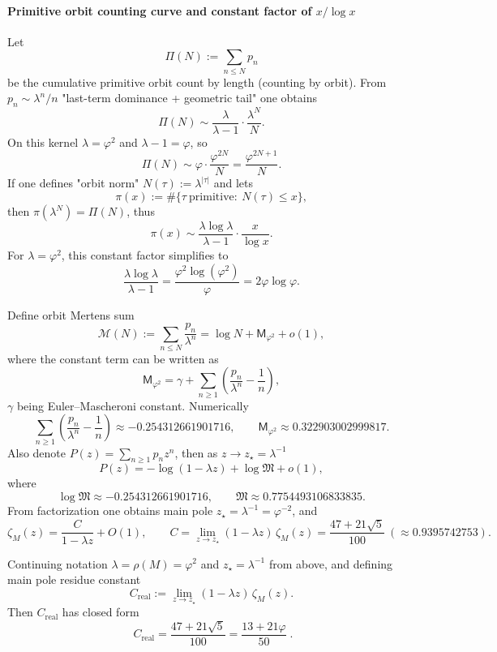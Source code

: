 \paragraph{Primitive orbit counting curve and constant factor of \texorpdfstring{$x/\log x$}{x/log x}}\label{par:finite-rh-primitive-xlogx}
Let
\[
\Pi(N):=\sum_{n\le N}p_n
\]
be the cumulative primitive orbit count by length (counting by orbit). From $p_n\sim \lambda^n/n$ "last-term dominance + geometric tail" one obtains
\[
\Pi(N)\sim \frac{\lambda}{\lambda-1}\cdot \frac{\lambda^N}{N}.
\]
On this kernel $\lambda=\varphi^2$ and $\lambda-1=\varphi$, so
\[
\Pi(N)\sim \varphi\cdot\frac{\varphi^{2N}}{N}=\frac{\varphi^{2N+1}}{N}.
\]
If one defines "orbit norm" $N(\tau):=\lambda^{|\tau|}$ and lets
\[
\pi(x):=\#\{\tau\ \mathrm{primitive}:\ N(\tau)\le x\},
\]
then $\pi(\lambda^N)=\Pi(N)$, thus
\[
\pi(x)\sim \frac{\lambda\log\lambda}{\lambda-1}\cdot \frac{x}{\log x}.
\]
For $\lambda=\varphi^2$, this constant factor simplifies to
\[
\frac{\lambda\log\lambda}{\lambda-1}
=\frac{\varphi^2\log(\varphi^2)}{\varphi}
=2\varphi\log\varphi.
\]

Define orbit Mertens sum
\[
\mathcal{M}(N):=\sum_{n\le N}\frac{p_n}{\lambda^n}
=\log N+\mathsf{M}_{\varphi^2}+o(1),
\]
where the constant term can be written as
\[
\mathsf{M}_{\varphi^2}
=\gamma+\sum_{n\ge 1}\left(\frac{p_n}{\lambda^n}-\frac{1}{n}\right),
\]
$\gamma$ being Euler--Mascheroni constant. Numerically
\[
\sum_{n\ge 1}\left(\frac{p_n}{\lambda^n}-\frac{1}{n}\right)\approx -0.254312661901716,
\qquad
\mathsf{M}_{\varphi^2}\approx 0.322903002999817.
\]
Also denote $P(z)=\sum_{n\ge 1}p_n z^n$, then as $z\to z_\star=\lambda^{-1}$
\[
P(z)=-\log(1-\lambda z)+\log\mathfrak{M}+o(1),
\]
where
\[
\log\mathfrak{M}\approx -0.254312661901716,\qquad
\mathfrak{M}\approx 0.7754493106833835.
\]
From factorization one obtains main pole $z_\star=\lambda^{-1}=\varphi^{-2}$, and
\[
\zeta_M(z)=\frac{C}{1-\lambda z}+O(1),\qquad
C=\lim_{z\to z_\star}(1-\lambda z)\,\zeta_M(z)=\frac{47+21\sqrt5}{100}\ (\approx 0.9395742753).
\]

\begin{proposition}\label{prop:real-input-40-residue-constant}
Continuing notation \(\lambda=\rho(M)=\varphi^2\) and \(z_\star=\lambda^{-1}\) from above, and defining main pole residue constant
\[
C_{\mathrm{real}}:=\lim_{z\to z_\star}(1-\lambda z)\,\zeta_M(z).
\]
Then \(C_{\mathrm{real}}\) has closed form
\[
\boxed{\;
C_{\mathrm{real}}=\frac{47+21\sqrt5}{100}=\frac{13+21\varphi}{50}\; }.
\]
\end{proposition}

